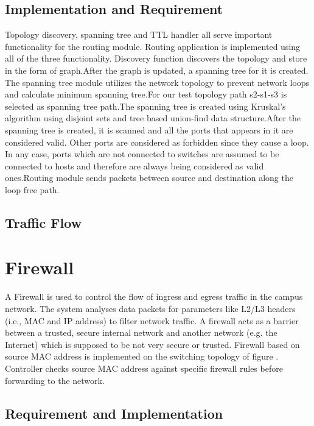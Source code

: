 \subsection{Implementation and Requirement}

Topology discovery, spanning tree and TTL handler all serve important functionality for the routing module. Routing application is implemented using all of the three functionality. Discovery function discovers the topology and store in the form of graph.After the graph is updated, a spanning tree for it is created. The spanning tree module utilizes the network topology to prevent network loops and calculate minimum spanning tree.For our test topology path s2-s1-s3 is selected as spanning tree path.The spanning tree is created using Kruskal's
algorithm using disjoint sets and tree based union-find data structure.After the spanning tree is created, it is scanned and all the ports that appears in it are considered valid. Other ports are considered as forbidden since they cause a loop. In any case, ports which are not connected to switches are assumed to be connected to hosts and therefore are always being considered as valid ones.Routing module sends packets between source and destination along the loop free path.
 

\subsection{Traffic Flow}

\section{Firewall}

A Firewall is used to control the flow of ingress and egress traffic in the campus network. The system analyses data packets for parameters like L2/L3 headers (i.e., MAC and IP address) to filter network traffic. A firewall  acts as a barrier between a trusted, secure internal network and another network (e.g. the Internet) which is supposed to be not very secure or trusted.
Firewall based on source MAC address is implemented on the switching topology of figure . Controller checks source MAC address against specific firewall rules before forwarding to the network.

\subsection{Requirement and Implementation}

